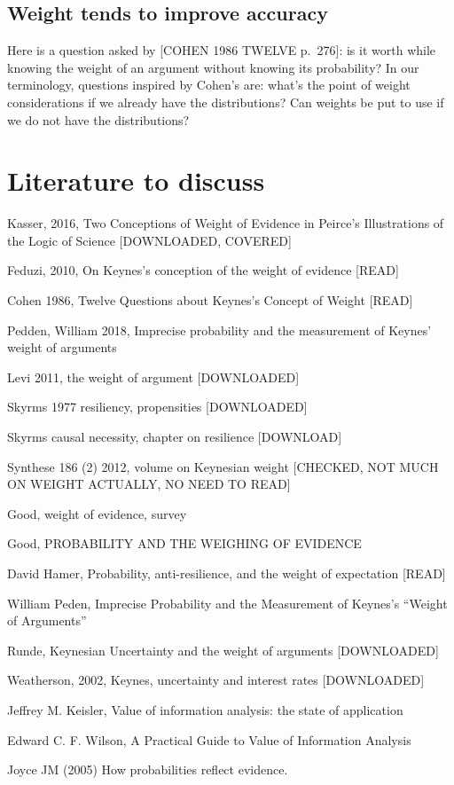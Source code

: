 \documentclass[
  10pt,
  dvipsnames,enabledeprecatedfontcommands]{scrartcl}
\begin{document}
\hypertarget{weight-tends-to-improve-accuracy}{%
\subsection{Weight tends to improve
accuracy}\label{weight-tends-to-improve-accuracy}}

Here is a question asked by {[}COHEN 1986 TWELVE p.~276{]}: is it worth
while knowing the weight of an argument without knowing its probability?
In our terminology, questions inspired by Cohen's are: what's the point
of weight considerations if we already have the distributions? Can
weights be put to use if we do not have the distributions?

\hypertarget{literature-to-discuss}{%
\section{Literature to discuss}\label{literature-to-discuss}}

Kasser, 2016, Two Conceptions of Weight of Evidence in Peirce's
Illustrations of the Logic of Science {[}DOWNLOADED, COVERED{]}

Feduzi, 2010, On Keynes's conception of the weight of evidence
{[}READ{]}

Cohen 1986, Twelve Questions about Keynes's Concept of Weight {[}READ{]}

Pedden, William 2018, Imprecise probability and the measurement of
Keynes' weight of arguments

Levi 2011, the weight of argument {[}DOWNLOADED{]}

Skyrms 1977 resiliency, propensities {[}DOWNLOADED{]}

Skyrms causal necessity, chapter on resilience {[}DOWNLOAD{]}

Synthese 186 (2) 2012, volume on Keynesian weight {[}CHECKED, NOT MUCH
ON WEIGHT ACTUALLY, NO NEED TO READ{]}

Good, weight of evidence, survey

Good, PROBABILITY AND THE WEIGHING OF EVIDENCE

David Hamer, Probability, anti-resilience, and the weight of expectation
{[}READ{]}

William Peden, Imprecise Probability and the Measurement of Keynes's
``Weight of Arguments''

Runde, Keynesian Uncertainty and the weight of arguments
{[}DOWNLOADED{]}

Weatherson, 2002, Keynes, uncertainty and interest rates
{[}DOWNLOADED{]}

Jeffrey M. Keisler, Value of information analysis: the state of
application

Edward C. F. Wilson, A Practical Guide to Value of Information Analysis

Joyce JM (2005) How probabilities reflect evidence.
\end{document}
